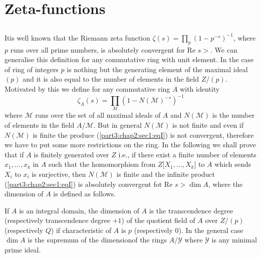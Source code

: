 \chapter{Zeta-functions}\label{part3:chap2}

\section{}\label{part3:chap2:sec1}

It\pageoriginale is well known that the Riemann zeta function $\zeta (s) =
\prod\limits_{p} (1-p^{-s})^{-1}$, where $p$ runs over all prime
numbers, is absolutely convergent for Re $s > $. We can
generalise this definition for any commutative ring with unit element. 
In the case of ring of integers $p$ is nothing  but the generating
element of the  maximal ideal $(p)$ and it is also equal to the number
of elements in the field $Z/(p)$. Motivated by this we define  for any
commutative ring $A$ with identity 
\begin{equation} 
  \zeta_A (s) =\prod_{\mathcal{M}} (1-N(\mathcal{M})^{-s})^{-1}
  \tag{I}\label{part3:chap2:sec1:eqI} 
\end{equation}
where $\mathcal{M}$ runs over the set of all maximal ideals of $A$ and
$N(\mathcal{M})$ is the number of elements in the field $A/
\mathcal{M}$. But in general $N(\mathcal{M})$ is not finite and even
if $N(\mathcal{M})$ is finite the produce (\ref{part3:chap2:sec1:eqI}) is not convergent,
therefore we have to put some more restrictions on the ring.  In the
following we shall prove that if $A$ is finitely generated over $Z$
i.e., if there exist a finite number of elements $x_1, \ldots,  x_k$
in $A$ such that the homomorphism from $Z \bigg [ X_1, \ldots, 
  X_k\bigg]$ to $A$ which sends  $X_i$ to $x_i$ is surjective,  then
$N(\mathcal{M})$ is finite and the infinite product
(\ref{part3:chap2:sec1:eqI})  is
absolutely convergent fot Re $s > \dim A$, where the dimension
of $A$ is defined as follows. 

\begin{defi*}
  If $A$ is an integral domain,  the dimension  of $A$ is the
  transcendence degree (respectively transcendence degree $+1$) of the
  quotient field of  $A$ over $Z/(p)$ (respectively $Q$) if
  characteristic of $A$ is $p$ (respectively 0). In the general case
  $\dim A$ is the supremum of the dimension\pageoriginale of the rings $A/
  \mathscr{Y}$ where $\mathscr{Y}$ is any minimal prime ideal. 
\end{defi*}

